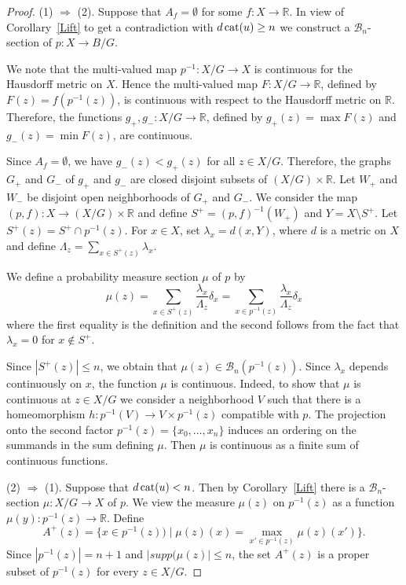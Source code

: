 \documentclass{amsart}
\numberwithin{equation}{section}
\theoremstyle{plain}
\theoremstyle{definition}
\def\cat{\protect\operatorname{cat}}
\begin{document}
\begin{proof}


(1) $\Rightarrow$ (2). Suppose that $A_f=\emptyset$ for some $f:X\to\mathbb R$. In view of Corollary~\ref{Lift} to get a contradiction with  $d\cat(u)\ge n$ we 
construct a $\mathcal B_n$-section of $p:X\to B/G$.

We note that the multi-valued map $p^{-1}:X/G\to X$ is continuous for the Hausdorff metric on $X$. Hence the multi-valued map $F:X/G\to\mathbb R$, defined by
$F(z)=f(p^{-1}(z))$, is continuous with respect to the Hausdorff metric on $\mathbb R$. Therefore, the functions $g_+,g_-:X/G\to\mathbb R$, 
defined by $g_+(z)=\max F(z)$ and $g_-(z)=\min F(z)$, are continuous. 


Since $A_f=\emptyset$,  we have $g_-(z)<g_+(z)$ for all $z\in X/G$. Therefore, the graphs $G_+$ and $G_-$ of
$g_+$ and $g_-$ are closed disjoint subsets of $(X/G)\times\mathbb R$. Let $W_+$ and $W_-$ be disjoint open neighborhoods of $G_+$ and $G_-$.  We consider the map $(p,f):X\to (X/G)\times\mathbb R$ and define
$S^+=(p,f)^{-1}(W_+)$ and $Y=X\setminus S^+$. Let $S^+(z)=S^+\cap p^{-1}(z)$.
For $x\in X$, set $\lambda_x=d(x,Y)$, where  $d$ is a metric on $X$ and define $\Lambda_z=\sum_{x\in S^+(z)}\lambda_x$.

We define a probability measure section $\mu$ of $p$
by
$$
\mu(z)=\sum_{x\in S^+(z)}\frac{\lambda_x}{\Lambda_z}\delta_{x}=\sum_{x\in p^{-1}(z)}\frac{\lambda_x}{\Lambda_z}\delta_{x}$$
where the first equality is the definition and the second follows from the fact that $\lambda_x=0$ for $x\notin S^+$. 


Since $|S^+(z)|\le n$, we obtain that $\mu(z)\in \mathcal B_n(p^{-1}(z))$. Since $\lambda_x$ depends continuously on $x$, the function $\mu$ is continuous.
Indeed, to show that $\mu$ is continuous at $z\in X/G$ we consider a neighborhood $V$ such that there is a homeomorphism $h:p^{-1}(V)\to V\times p^{-1}(z)$ compatible with $p$. 
The projection onto the second factor $p^{-1}(z)=\{x_0,\dots, x_n\}$ induces an ordering on the  summands in the sum defining $\mu$. Then $\mu$ is continuous as a finite sum of continuous functions.






(2) $\Rightarrow$ (1). Suppose that $d\cat(u)< n$.  Then by Corollary~\ref{Lift}
there is a $\mathcal B_n$-section $\mu:X/G\to X$ of $p$. We view the measure $\mu(z)$ on $p^{-1}(z)$ as a function $\mu(y):p^{-1}(z)\to\mathbb R$. Define
$$A^+(z)=\{x\in p^{-1}(z))\mid \mu(z)(x)=\max_{x'\in p^{-1}(z)}\mu(z)(x')\}.$$
Since $|p^{-1}(z)|=n+1$ and $|supp(\mu(z)|\le n$, the set $A^+(z)$ is a proper subset of $p^{-1}(z)$ for every $z\in X/G$.


\end{proof}
\end{document}
